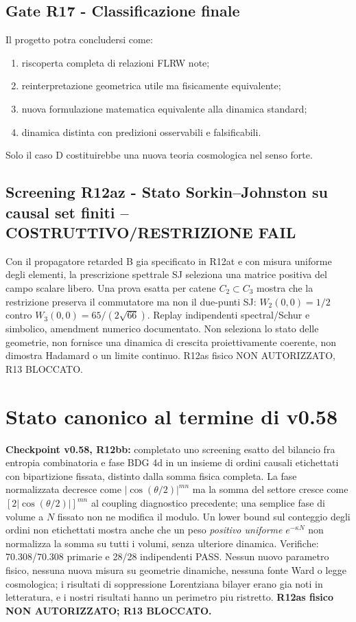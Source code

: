 \documentclass[11pt,a4paper]{article}
\begin{document}
\subsection*{Gate R17 - Classificazione finale}
Il progetto potra concludersi come:
\begin{enumerate}[label=\Alph*.]
\item riscoperta completa di relazioni FLRW note;
\item reinterpretazione geometrica utile ma fisicamente equivalente;
\item nuova formulazione matematica equivalente alla dinamica standard;
\item dinamica distinta con predizioni osservabili e falsificabili.
\end{enumerate}
Solo il caso D costituirebbe una nuova teoria cosmologica nel senso forte.


\subsection*{Screening R12az - Stato Sorkin--Johnston su causal set finiti -- COSTRUTTIVO/RESTRIZIONE FAIL}
Con il propagatore retarded B gia specificato in R12at e con misura uniforme degli elementi, la prescrizione spettrale SJ seleziona una matrice positiva del campo scalare libero. Una prova esatta per catene $C_2\subset C_3$ mostra che la restrizione preserva il commutatore ma non il due-punti SJ: $W_2(0,0)=1/2$ contro $W_3(0,0)=65/(2\sqrt{66})$. Replay indipendenti spectral/Schur e simbolico, amendment numerico documentato. Non seleziona lo stato delle geometrie, non fornisce una dinamica di crescita proiettivamente coerente, non dimostra Hadamard o un limite continuo. R12as fisico NON AUTORIZZATO, R13 BLOCCATO.

\section{Stato canonico al termine di v0.58}
\textbf{Checkpoint v0.58, R12bb:} completato uno screening esatto del bilancio fra entropia combinatoria e fase BDG 4d in un insieme di ordini causali etichettati con bipartizione fissata, distinto dalla somma fisica completa. La fase normalizzata decresce come $|\cos(\theta/2)|^{mn}$ ma la somma del settore cresce come $[2|\cos(\theta/2)|]^{mn}$ al coupling diagnostico precedente; una semplice fase di volume a $N$ fissato non ne modifica il modulo. Un lower bound sul conteggio degli ordini non etichettati mostra anche che un peso \emph{positivo uniforme} $e^{-\kappa N}$ non normalizza la somma su tutti i volumi, senza ulteriore dinamica. Verifiche: 70.308/70.308 primarie e 28/28 indipendenti PASS. Nessun nuovo parametro fisico, nessuna nuova misura su geometrie dinamiche, nessuna fonte Ward o legge cosmologica; i risultati di soppressione Lorentziana bilayer erano gia noti in letteratura, e i nostri risultati hanno un perimetro piu ristretto. \textbf{R12as fisico NON AUTORIZZATO; R13 BLOCCATO.}\par\medskip
\end{document}
